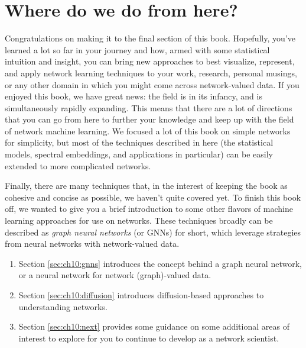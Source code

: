 \chapter{Where do we do from here?}
\label{sec:ch10}

Congratulations on making it to the final section of this book. Hopefully, you've learned a lot so far in your journey and how, armed with some statistical intuition and insight, you can bring new approaches to best visualize, represent, and apply network learning techniques to your work, research, personal musings, or any other domain in which you might come across network-valued data. If you enjoyed this book, we have great news: the field is in its infancy, and is simultaneously rapidly expanding. This means that there are a lot of directions that you can go from here to further your knowledge and keep up with the field of network machine learning. We focused a lot of this book on simple networks for simplicity, but most of the techniques described in here (the statistical models, spectral embeddings, and applications in particular) can be easily extended to more complicated networks. 

Finally, there are many techniques that, in the interest of keeping the book as cohesive and concise as possible, we haven't quite covered yet. To finish this book off, we wanted to give you a brief introduction to some other flavors of machine learning approaches for use on networks. These techniques broadly can be described as \textit{graph neural networks} (or GNNs) for short, which leverage strategies from neural networks with network-valued data.

\begin{enumerate}
    \item Section \ref{sec:ch10:gnns} introduces the concept behind a graph neural network, or a neural network for network (graph)-valued data.
    \item Section \ref{sec:ch10:diffusion} introduces diffusion-based approaches to understanding networks.
    \item Section \ref{sec:ch10:next} provides some guidance on some additional areas of interest to explore for you to continue to develop as a network scientist.
\end{enumerate}

